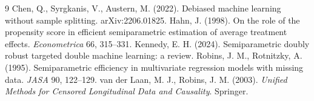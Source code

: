 \documentclass[11pt]{article}
\theoremstyle{plain}
\theoremstyle{definition}
\theoremstyle{remark}
\begin{document}
\begin{thebibliography}{9}
 Chen, Q., Syrgkanis, V., Austern, M.
  (2022). Debiased machine learning without sample splitting.
  arXiv:2206.01825.
 Hahn, J. (1998). On the role of the propensity
  score in efficient semiparametric estimation of average treatment effects.
  \emph{Econometrica} 66, 315--331.
 Kennedy, E. H. (2024). Semiparametric
  doubly robust targeted double machine learning: a review.
 Robins, J. M., Rotnitzky, A.
  (1995). Semiparametric efficiency in multivariate regression models with
  missing data. \emph{JASA} 90, 122--129.
 van der Laan, M. J.,
  Robins, J. M. (2003). \emph{Unified Methods for Censored Longitudinal Data
  and Causality}. Springer.
\end{thebibliography}
\end{document}
